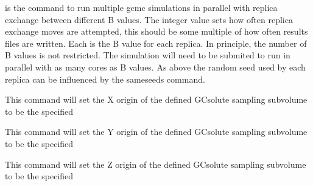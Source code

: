 \documentclass[letterpaper,10pt,english]{sphinxmanual}
\begin{document}
\ignorespaces 
\def\sphinxLiteralBlockLabel{\label{\detokenize{protoms:index-57}}}
%
\begin{sphinxVerbatim}[commandchars=\\\{\}]
    
\end{sphinxVerbatim}

is the command to run multiple gcmc simulations in parallel with replica exchange between different B values. The integer value sets how often replica exchange moves are attempted, this should be some multiple of how often results files are written. Each  is the B value for each replica. In principle, the number of B values is not restricted. The simulation will need to be submited to run in parallel with as many cores as B values. As above the random seed used by each replica can be influenced by the sameseeds command.

\ignorespaces 
\def\sphinxLiteralBlockLabel{\label{\detokenize{protoms:index-58}}}
%
\begin{sphinxVerbatim}[commandchars=\\\{\}]
 
\end{sphinxVerbatim}

This command will set the X origin of the defined GCsolute sampling subvolume to be the specified 

%
\begin{sphinxVerbatim}[commandchars=\\\{\}]
 
\end{sphinxVerbatim}

This command will set the Y origin of the defined GCsolute sampling subvolume to be the specified 

%
\begin{sphinxVerbatim}[commandchars=\\\{\}]
 
\end{sphinxVerbatim}

This command will set the Z origin of the defined GCsolute sampling subvolume to be the specified 

%
\begin{sphinxVerbatim}[commandchars=\\\{\}]
 
\end{sphinxVerbatim}
\end{document}
